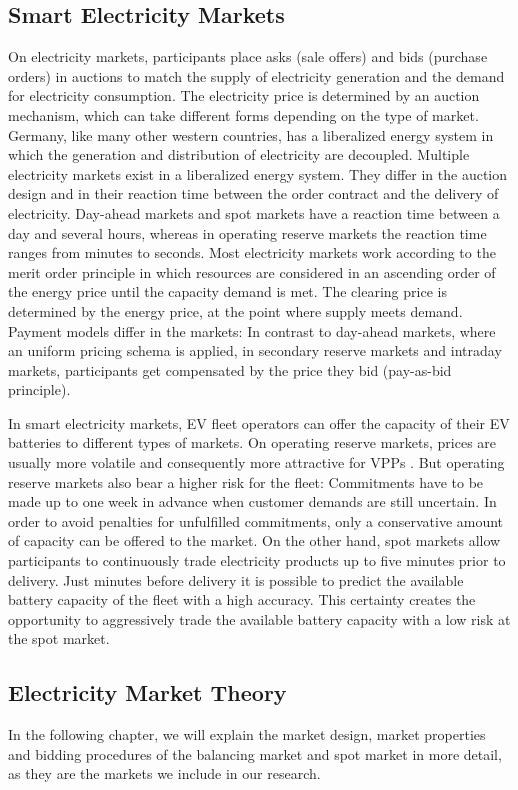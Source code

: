 \documentclass[a4paper, 12pt]{article}
\let\cite\shortcite
\begin{document}
\subsection{Smart Electricity Markets}
\label{sec:org270a0b7}
On electricity markets, participants place asks (sale offers) and bids (purchase
orders) in auctions to match the supply of electricity generation and the demand
for electricity consumption. The electricity price is determined by an auction
mechanism, which can take different forms depending on the type of market.
Germany, like many other western countries, has a liberalized energy system in
which the generation and distribution of electricity are decoupled. Multiple
electricity markets exist in a liberalized energy system. They differ in the
auction design and in their reaction time between the order contract and the
delivery of electricity. Day-ahead markets and spot markets have a reaction time
between a day and several hours, whereas in operating reserve markets the
reaction time ranges from minutes to seconds. Most electricity markets work
according to the merit order principle in which resources are considered in an
ascending order of the energy price until the capacity demand is met. The
clearing price is determined by the energy price, at the point where supply
meets demand. Payment models differ in the markets: In contrast to day-ahead
markets, where an uniform pricing schema is applied, in secondary reserve
markets and intraday markets, participants get compensated by the price they bid
(pay-as-bid principle).

In smart electricity markets, EV fleet operators can offer the capacity of their
EV batteries to different types of markets. On operating reserve markets, prices
are usually more volatile and consequently more attractive for VPPs
\cite{tomic07_using_fleet_elect_drive_vehic_grid_suppor}. But operating reserve
markets also bear a higher risk for the fleet: Commitments have to be made up to
one week in advance when customer demands are still uncertain. In order to avoid
penalties for unfulfilled commitments, only a conservative amount of capacity
can be offered to the market. On the other hand, spot markets allow participants
to continuously trade electricity products up to five minutes prior to delivery.
Just minutes before delivery it is possible to predict the available battery
capacity of the fleet with a high accuracy. This certainty creates the
opportunity to aggressively trade the available battery capacity with a low risk
at the spot market.
\subsection{Electricity Market Theory}
\label{sec:orgfa5492f}
In the following chapter, we will explain the market design, market properties
and bidding procedures of the balancing market and spot market in more detail,
as they are the markets we include in our research.
\end{document}
